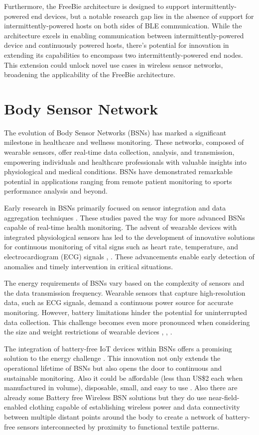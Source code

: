 \noindent Furthermore, the FreeBie architecture is designed to support intermittently-powered end devices, but a notable research gap lies in the absence of support for intermittently-powered hosts on both sides of BLE communication. While the architecture excels in enabling communication between intermittently-powered device and continuously powered hosts, there's potential for innovation in extending its capabilities to encompass two intermittently-powered end nodes. This extension could unlock novel use cases in wireless sensor networks, broadening the applicability of the FreeBie architecture.


\section{Body Sensor Network}
The evolution of Body Sensor Networks (BSNs) has marked a significant milestone in healthcare and wellness monitoring. These networks, composed of wearable sensors, offer real-time data collection, analysis, and transmission, empowering individuals and healthcare professionals with valuable insights into physiological and medical conditions. BSNs have demonstrated remarkable potential in applications ranging from remote patient monitoring to sports performance analysis and beyond.

\noindent Early research in BSNs primarily focused on sensor integration and data aggregation techniques \cite{5678072}. These studies paved the way for more advanced BSNs capable of real-time health monitoring. The advent of wearable devices with integrated physiological sensors has led to the development of innovative solutions for continuous monitoring of vital signs such as heart rate, temperature, and electrocardiogram (ECG) signals \cite{BSNreview}, \cite{6555588}. These advancements enable early detection of anomalies and timely intervention in critical situations.

\noindent The energy requirements of BSNs vary based on the complexity of sensors and the data transmission frequency. Wearable sensors that capture high-resolution data, such as ECG signals, demand a continuous power source for accurate monitoring. However, battery limitations hinder the potential for uninterrupted data collection. This challenge becomes even more pronounced when considering the size and weight restrictions of wearable devices \cite{WANG2020112410}, \cite{4755157}, \cite{6755575}.

\noindent The integration of battery-free IoT devices within BSNs offers a promising solution to the energy challenge \cite{5370806}. This innovation not only extends the operational lifetime of BSNs but also opens the door to continuous and sustainable monitoring. Also it could be affordable (less than US\$2 each when manufactured in volume), disposable, small, and easy to use \cite{5370806}. Also there are already some Battery free Wireless BSN solutions but they do use near-field-enabled clothing capable of establishing wireless power and data connectivity between multiple distant points around the body to create a network of battery-free sensors interconnected by proximity to functional textile patterns.\cite{Lin_Kim_Achavananthadith_Kurt_Tan_Yao_Tee_Lee_Ho_2020}

